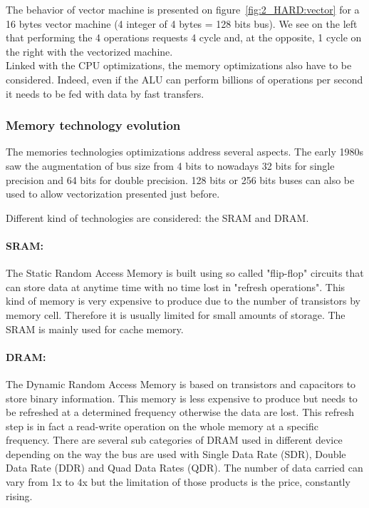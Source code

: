 The behavior of vector machine is presented on figure~\ref{fig:2_HARD:vector} for a 16 bytes vector machine (4 integer of 4 bytes = 128 bits bus). 
We see on the left that performing the 4 operations requests 4 cycle and, at the opposite, 1 cycle on the right with the vectorized machine.\\

Linked with the CPU optimizations, the memory optimizations also have to be considered. 
Indeed, even if the ALU can perform billions of operations per second it needs to be fed with data by fast transfers.

\subsubsection{Memory technology evolution}

The memories technologies optimizations address several aspects. 
The early 1980s saw the augmentation of bus size from 4 bits to nowadays 32 bits for single precision and 64 bits for double precision. 
128 bits or 256 bits buses can also be used to allow vectorization presented just before. 

Different kind of technologies are considered: the SRAM and DRAM. 

\paragraph{SRAM: }
The Static Random Access Memory is built using so called "flip-flop" circuits that can store data at anytime time with no time lost in "refresh operations".
This kind of memory is very expensive to produce due to the number of transistors by memory cell.
Therefore it is usually limited for small amounts of storage. 
The SRAM is mainly used for cache memory. 

\paragraph{DRAM: }
The Dynamic Random Access Memory is based on transistors and capacitors to store binary information.
This memory is less expensive to produce but needs to be refreshed at a determined frequency otherwise the data are lost. 
This refresh step is in fact a read-write operation on the whole memory at a specific frequency. 
There are several sub categories of DRAM used in different device depending on the way the bus are used with Single Data Rate (SDR), Double Data Rate (DDR) and Quad Data Rates (QDR). 
The number of data carried can vary from 1x to 4x but the limitation of those products is the price, constantly rising. 

